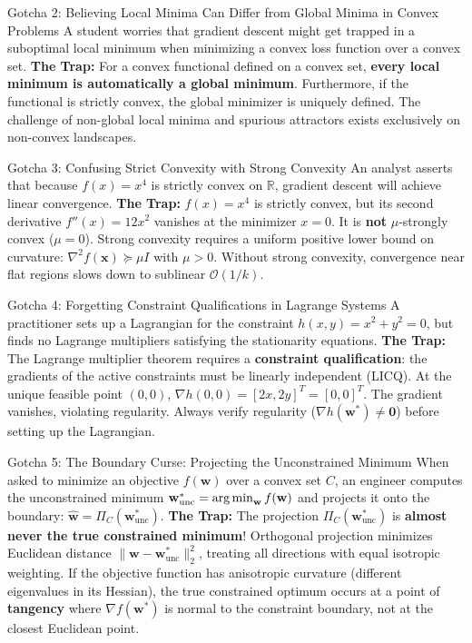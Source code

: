 \begin{trapbox}{Gotcha 2: Believing Local Minima Can Differ from Global Minima in Convex Problems}
A student worries that gradient descent might get trapped in a suboptimal local minimum when minimizing a convex loss function over a convex set.
\tcblower
\textbf{The Trap:} For a convex functional defined on a convex set, \textbf{every local minimum is automatically a global minimum}. Furthermore, if the functional is strictly convex, the global minimizer is uniquely defined. The challenge of non-global local minima and spurious attractors exists exclusively on non-convex landscapes.
\end{trapbox}

\begin{trapbox}{Gotcha 3: Confusing Strict Convexity with Strong Convexity}
An analyst asserts that because $f(x) = x^4$ is strictly convex on $\mathbb{R}$, gradient descent will achieve linear convergence.
\tcblower
\textbf{The Trap:} $f(x) = x^4$ is strictly convex, but its second derivative $f''(x) = 12x^2$ vanishes at the minimizer $x = 0$. It is \textbf{not} $\mu$-strongly convex ($\mu = 0$). Strong convexity requires a uniform positive lower bound on curvature: $\nabla^2 f(\mathbf{x}) \succeq \mu I$ with $\mu > 0$. Without strong convexity, convergence near flat regions slows down to sublinear $\mathcal{O}(1/k)$.
\end{trapbox}

\begin{trapbox}{Gotcha 4: Forgetting Constraint Qualifications in Lagrange Systems}
A practitioner sets up a Lagrangian for the constraint $h(x, y) = x^2 + y^2 = 0$, but finds no Lagrange multipliers satisfying the stationarity equations.
\tcblower
\textbf{The Trap:} The Lagrange multiplier theorem requires a \textbf{constraint qualification}: the gradients of the active constraints must be linearly independent (LICQ). At the unique feasible point $(0, 0)$, $\nabla h(0, 0) = [2x, 2y]^T = [0, 0]^T$. The gradient vanishes, violating regularity. Always verify regularity ($\nabla h(\mathbf{w}^*) \ne \mathbf{0}$) before setting up the Lagrangian.
\end{trapbox}

\begin{trapbox}{Gotcha 5: The Boundary Curse: Projecting the Unconstrained Minimum}
When asked to minimize an objective $f(\mathbf{w})$ over a convex set $C$, an engineer computes the unconstrained minimum $\mathbf{w}_{\text{unc}}^* = \operatorname*{arg\,min}_{\mathbf{w}} f(\mathbf{w})$ and projects it onto the boundary: $\hat{\mathbf{w}} = \Pi_C(\mathbf{w}_{\text{unc}}^*)$.
\tcblower
\textbf{The Trap:} The projection $\Pi_C(\mathbf{w}_{\text{unc}}^*)$ is \textbf{almost never the true constrained minimum}! Orthogonal projection minimizes Euclidean distance $\|\mathbf{w} - \mathbf{w}_{\text{unc}}^*\|_2^2$, treating all directions with equal isotropic weighting. If the objective function has anisotropic curvature (different eigenvalues in its Hessian), the true constrained optimum occurs at a point of \textbf{tangency} where $\nabla f(\mathbf{w}^*)$ is normal to the constraint boundary, not at the closest Euclidean point.
\end{trapbox}

